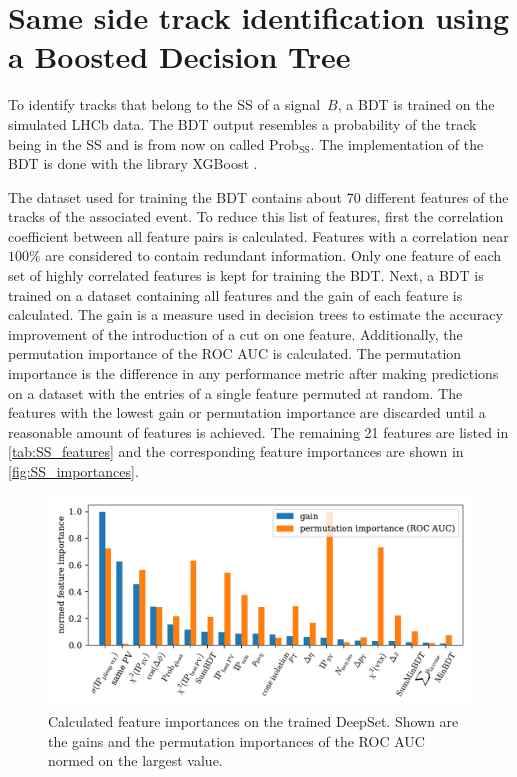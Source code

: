 \section{Same side track identification using a Boosted Decision Tree}
\label{sec:SS_classifier}

To identify tracks that belong to the SS of a signal~$B$, a BDT is trained on the simulated LHCb data. 
The BDT output resembles a probability of the track being in the SS and is from now on called $\text{Prob}_\text{SS}$. %
The implementation of the BDT is done with the library XGBoost \cite{xgboost}.

The dataset used for training the BDT contains about 70 different features of the tracks of the associated event.
To reduce this list of features, first the correlation coefficient between all feature pairs is calculated.
Features with a correlation near $100\%$ are considered to contain redundant information. %
Only one feature of each set of highly correlated features is kept for training the BDT.
Next, a BDT is trained on a dataset containing all features and the gain of each feature is calculated.
The gain is a measure used in decision trees to estimate the accuracy improvement of the introduction of a cut on one feature.
Additionally, the permutation importance of the ROC AUC is calculated.
The permutation importance is the difference in any performance metric after making predictions on a dataset with the entries of a single feature permuted at random.
The features with the lowest gain or permutation importance are discarded until a reasonable amount of features is achieved.
The remaining 21 features are listed in \autoref{tab:SS_features} and the corresponding feature importances are shown in \autoref{fig:SS_importances}.

\begin{figure}
    \centering
    \includegraphics[width=\textwidth]{images/SS_feature_importances.pdf}
    \caption{Calculated feature importances on the trained DeepSet. Shown are the gains and the permutation importances of the ROC AUC normed on the largest value.}
    \label{fig:SS_importances}
\end{figure}

